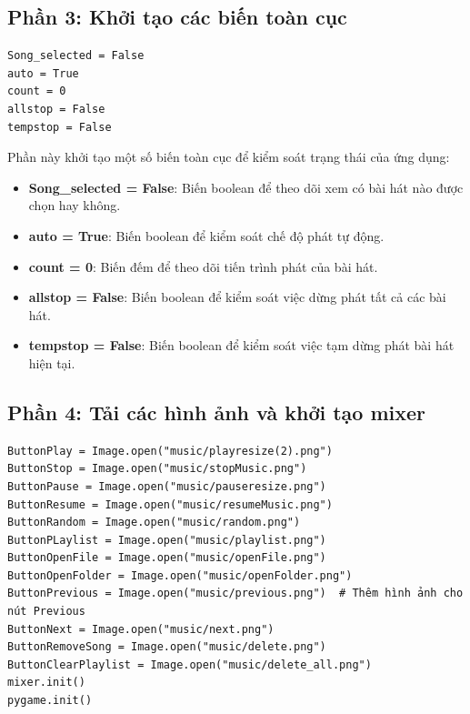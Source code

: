 \documentclass[a4paper]{article}
\begin{document}
\begin{enumerate}
\subsection{Phần 3: Khởi tạo các biến toàn cục}
\begin{mdframed}[hidealllines=true,backgroundcolor=magenta!10]
\begin{lstlisting}
Song_selected = False
auto = True
count = 0
allstop = False
tempstop = False
\end{lstlisting}
\end{mdframed}
Phần này khởi tạo một số biến toàn cục để kiểm soát trạng thái của ứng dụng:
\begin{itemize}
   \item \textbf{Song\_selected = False}: Biến boolean để theo dõi xem có bài hát nào được chọn hay không.
   \item \textbf{auto = True}: Biến boolean để kiểm soát chế độ phát tự động.
   \item \textbf{count = 0}: Biến đếm để theo dõi tiến trình phát của bài hát.
   \item \textbf{allstop = False}: Biến boolean để kiểm soát việc dừng phát tất cả các bài hát.
   \item \textbf{tempstop = False}: Biến boolean để kiểm soát việc tạm dừng phát bài hát hiện tại.
\end{itemize}

\subsection{Phần 4: Tải các hình ảnh và khởi tạo mixer}
\begin{mdframed}[hidealllines=true,backgroundcolor=magenta!10]
\begin{lstlisting}
ButtonPlay = Image.open("music/playresize(2).png")
ButtonStop = Image.open("music/stopMusic.png")
ButtonPause = Image.open("music/pauseresize.png")
ButtonResume = Image.open("music/resumeMusic.png")
ButtonRandom = Image.open("music/random.png")
ButtonPLaylist = Image.open("music/playlist.png")
ButtonOpenFile = Image.open("music/openFile.png")
ButtonOpenFolder = Image.open("music/openFolder.png")
ButtonPrevious = Image.open("music/previous.png")  # Thêm hình ảnh cho nút Previous
ButtonNext = Image.open("music/next.png")
ButtonRemoveSong = Image.open("music/delete.png")
ButtonClearPlaylist = Image.open("music/delete_all.png")
mixer.init()
pygame.init()
\end{lstlisting}
\end{mdframed}


\end{enumerate}
\end{document}
